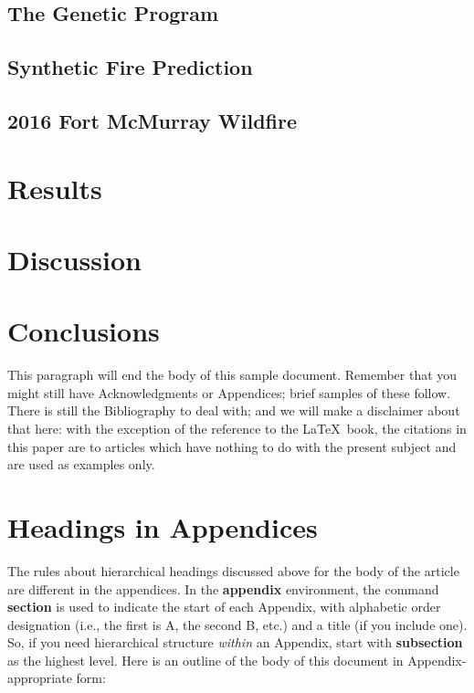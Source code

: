 \subsection{The Genetic Program}

\subsection{Synthetic Fire Prediction}
\subsection {2016 Fort McMurray Wildfire}

\section{Results}


\section{Discussion}



\section{Conclusions}
This paragraph will end the body of this sample document.
Remember that you might still have Acknowledgments or
Appendices; brief samples of these
follow.  There is still the Bibliography to deal with; and
we will make a disclaimer about that here: with the exception
of the reference to the \LaTeX\ book, the citations in
this paper are to articles which have nothing to
do with the present subject and are used as
examples only.



\appendix
\section{Headings in Appendices}
The rules about hierarchical headings discussed above for
the body of the article are different in the appendices.
In the \textbf{appendix} environment, the command
\textbf{section} is used to
indicate the start of each Appendix, with alphabetic order
designation (i.e., the first is A, the second B, etc.) and
a title (if you include one).  So, if you need
hierarchical structure
\textit{within} an Appendix, start with \textbf{subsection} as the
highest level. Here is an outline of the body of this
document in Appendix-appropriate form:
